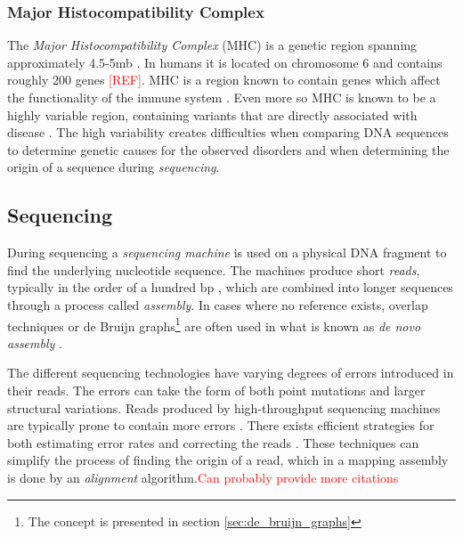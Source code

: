 \documentclass[thesis.tex]{subfiles}
\begin{document}
\subsubsection{Major Histocompatibility Complex}
\label{sec:mhc}
The \textit{Major Histocompatibility Complex} (MHC) is a genetic region spanning approximately 4.5-5mb \cite{improved_genome_inference_in_the_mhc_using_a_population_reference_graph}\cite{canonical_stable_general_mapping_using_context_schemes}. In humans it is located on chromosome 6 and contains roughly 200 genes \textcolor{red}{[REF]}. MHC is a region known to contain genes which affect the functionality of the immune system \cite{the_importance_of_immune_gene_variability_in_evolutionary_ecology_and_conservation}. Even more so MHC is known to be a highly variable region, containing variants that are directly associated with disease \cite{variation_analysis_and_gene_annotation_of_eight_mhc_haplotypes}. The high variability creates difficulties when comparing DNA sequences to determine genetic causes for the observed disorders and when determining the origin of a sequence during \textit{sequencing}.
\subsection{Sequencing}
\label{sec:sequencing}
During sequencing a \textit{sequencing machine} is used on a physical DNA fragment to find the underlying nucleotide sequence. The machines produce short \textit{reads}, typically in the order of a hundred bp \cite{sequencing_platforms}, which are combined into longer sequences through a process called \textit{assembly}.  In cases where no reference exists, overlap techniques \cite{an_eulerian_path_approach_to_dna_fragment_assembly} or de Bruijn graphs\footnote{The concept is presented in section \ref{sec:de_bruijn_graphs}} are often used in what is known as \textit{de novo assembly} \cite[Chapter 1, p. 19]{introduction_to_genomics}.\\
\par\noindent
The different sequencing technologies have varying degrees of errors introduced in their reads\cite{sequencing_platforms}. The errors can take the form of both point mutations and larger structural variations. Reads produced by high-throughput sequencing machines are typically prone to contain more errors  \cite{errors_start_end}. There exists efficient strategies for both estimating error rates \cite{estimation_of_sequencing_error_rates_in_short_reads} and correcting the reads \cite{error_correction_of_datasets_with_non_uniform_coverage}. These techniques can simplify the process of finding the origin of a read, which in a mapping assembly is done by an \textit{alignment} algorithm.\textcolor{red}{Can probably provide more citations}
\end{document}
